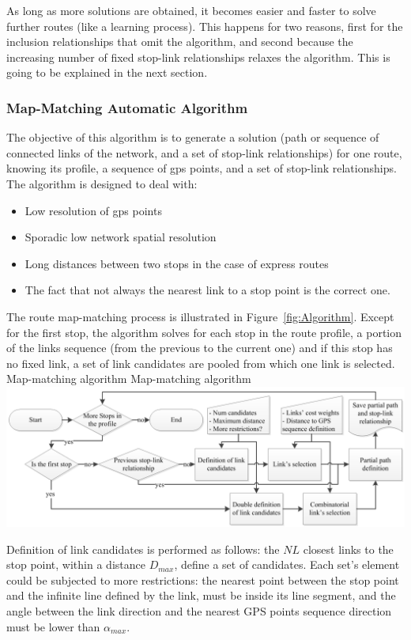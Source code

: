 As long as more solutions are obtained, it becomes easier and faster to solve further routes (like a learning process). This happens for two reasons, first for the inclusion relationships that omit the algorithm, and second because the increasing number of fixed stop-link relationships relaxes the algorithm. This is going to be explained in the next section.

\subsubsection{Map-Matching Automatic Algorithm}
The objective of this algorithm is to generate a solution (path or sequence of connected links of the network, and a set of stop-link relationships) for one route, knowing its profile, a sequence of \gls{gps} points, and a set of stop-link relationships. The algorithm is designed to deal with:
%
\begin{itemize}\styleItemize
\item	Low resolution of \gls{gps} points
\item	Sporadic low network spatial resolution
\item	Long distances between two stops in the case of express routes
\item	The fact that not always the nearest link to a stop point is the correct one.
\end{itemize}

The route map-matching process is illustrated in Figure~\ref{fig:Algorithm}. Except for the first stop, the algorithm solves for each stop in the route profile, a portion of the links sequence (from the previous to the current one) and if this stop has no fixed link, a set of link candidates are pooled from which one link is selected.
%
\createfigure
{Map-matching algorithm}
{Map-matching algorithm}
{\label{fig:Algorithm}}
{\includegraphics[width=1.0\textwidth]{extending/figures/semiAuto/Algorithm.png}}
{}

Definition of link candidates is performed as follows: the $NL$ closest links to the stop point, within a distance $D_{max}$, define a set of candidates. Each set's element could be subjected to more restrictions: the nearest point between the stop point and the infinite line defined by the link, must be inside its line segment, and the angle between the link direction and the nearest GPS points sequence direction must be lower than $\alpha_{max}$.

